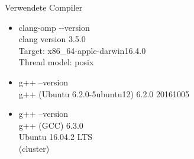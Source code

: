 \documentclass[
12pt,
a4paper,
BCOR10mm,
DIV14,
headsepline,
]{scrreprt}
\begin{document}
	Verwendete Compiler
	\begin{itemize}
		\item clang-omp -{}-version\\clang version 3.5.0 \\Target: x86\_64-apple-darwin16.4.0\\Thread model: posix	
		\item g++ --version\\g++ (Ubuntu 6.2.0-5ubuntu12) 6.2.0 20161005
		\item g++ --version\\g++ (GCC) 6.3.0\\Ubuntu 16.04.2 LTS\\(cluster)
	\end{itemize}
	
	
	
	
\end{document}
